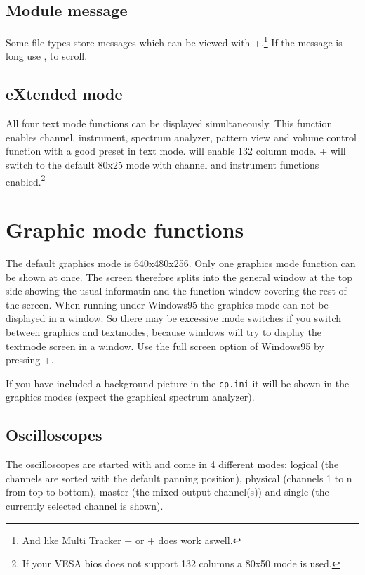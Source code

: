 \subsection{Module message}
Some file types store messages which can be viewed with
+.\footnote{And like Multi Tracker
+ or + does work aswell.} If
the message is long use ,  to scroll.

\subsection{eXtended mode}
All four text mode functions can be displayed simultaneously. This
function enables channel, instrument, spectrum analyzer, pattern view
and volume control function with a good preset in text mode. 
will enable 132 column mode. + will switch to the
default 80x25 mode with channel and instrument functions
enabled.\footnote{If your VESA bios does not support 132 columns a
80x50 mode is used.}

\section{Graphic mode functions}
The default graphics mode is 640x480x256. Only one graphics mode
function can be shown at once. The screen therefore splits into the
general window at the top side showing the usual informatin and the
function window covering the rest of the screen. {\small When running
under Windows95 the graphics mode can not be displayed in a window. So
there may be excessive mode switches if you switch between graphics
and textmodes, because windows will try to display the textmode screen
in a window. Use the full screen option of Windows95 by pressing
+.}

If you have included a background picture in the \texttt{cp.ini} it
will be shown in the graphics modes (expect the graphical spectrum
analyzer).

\subsection{Oscilloscopes}
The oscilloscopes are started with  and come in 4 different
modes: logical (the channels are sorted with the default panning
position), physical (channels 1 to n from top to bottom), master
(the mixed output channel(s)) and single (the currently selected
channel is shown).


